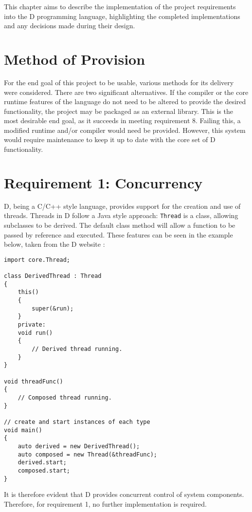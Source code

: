 %
%
%
This chapter aims to describe the implementation of the project requirements into the D
programming language, highlighting the completed implementations and any  
decisions made during their design.

\section{Method of Provision}
For the end goal of this project to be usable, various methods for its delivery 
were considered. There are two significant alternatives. 
If the compiler or the 
core runtime features of the language do not need to be altered to provide the 
desired functionality, the project may be packaged as an external library. 
This is the most desirable end goal, as it succeeds in meeting requirement 8. 
Failing this, a modified runtime and/or compiler would need be provided.
However, this system would require maintenance to keep it up to date with the
core set of D functionality. 

\section{Requirement 1: Concurrency}
D, being a C/C++ style language, provides support for the creation and use of 
threads. Threads in D follow a Java style approach: \texttt{Thread} is a class, 
allowing subclasses to be derived. The default 
class method will allow a function to be passed by reference and executed. 
These features can be seen in the example below, taken from the D website
\cite{core-thread}: 
\begin{lstlisting}[basicstyle=\small]
import core.Thread; 

class DerivedThread : Thread
{
    this()
    {
        super(&run);
    }
    private:
    void run()
    {
        // Derived thread running.
    }
}

void threadFunc()
{
    // Composed thread running.
}

// create and start instances of each type
void main()
{
    auto derived = new DerivedThread();
    auto composed = new Thread(&threadFunc);
    derived.start; 
    composed.start;
}
\end{lstlisting}
It is therefore evident that D provides 
concurrent control of system components. Therefore, for requirement 1, no
further implementation is required. 

